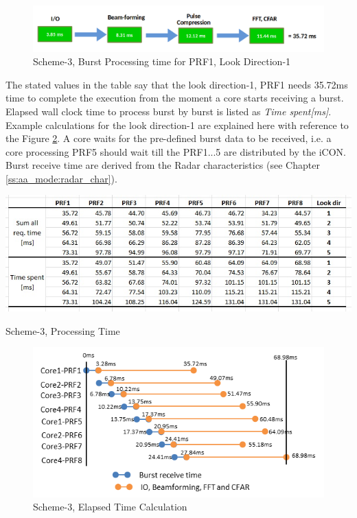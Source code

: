 \begin{figure}[h!]
	\centering
	\includegraphics[width=145mm]{figures/scheme3_req_time}
	\caption{Scheme-3, Burst Processing time for PRF1, Look Direction-1}
	\label{fig:mm:scheme3_req_time}
\end{figure}

The stated values in the table say that the look direction-1, PRF1 needs 35.72ms time to complete the execution from the moment a core starts receiving a burst. Elapsed wall clock time to process burst by burst is listed as \textsl{Time spent[ms]}. Example calculations for the look direction-1 are explained here with reference to the Figure \ref{fig:mm:scheme4_timeline_burst_proc}. A core waits for the pre-defined burst data to be received, i.e. a core processing PRF5 should wait till the PRF1...5 are distributed by the iCON. Burst receive time are derived from the Radar characteristics (see Chapter \ref{ss:aa_mode:radar_char}).

\begin{table}[h!]
	\centering
	\includegraphics[width=140mm]{figures/scheme4_elapsed_time}
	\caption{Scheme-3, Processing Time}
	\label{fig:mm:scheme4_elapsed_time}
\end{table}

\begin{figure}[h!]
	\centering
	\includegraphics[width=130mm]{figures/scheme4_timeline_burst_proc}
	\caption{Scheme-3, Elapsed Time Calculation}
	\label{fig:mm:scheme4_timeline_burst_proc}
\end{figure}

